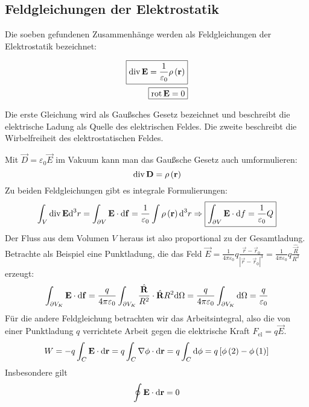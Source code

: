\subsection{Feldgleichungen der Elektrostatik\label{ref-020}}

Die soeben gefundenen Zusammenhänge werden als Feldgleichungen der Elektrostatik bezeichnet:

\begin{align}
	\label{3.4}
	\boxed{\operatorname{div} \mathbf{E}=\frac{1}{\varepsilon _{0}}\rho \left(\mathbf{r}\right)} \\
	\label{3.5}
	\boxed{\operatorname{rot} \mathbf{E}=0}
\end{align}

Die erste Gleichung wird als Gaußsches Gesetz bezeichnet und beschreibt die elektrische Ladung als Quelle des elektrischen Feldes. Die zweite beschreibt die Wirbelfreiheit des elektrostatischen Feldes.

Mit $\vec {D}=\varepsilon _{0}\vec {E}$ im Vakuum kann man das Gaußsche Gesetz auch umformulieren:
\begin{equation}
	\label{3.6}
	\operatorname{div} \mathbf{D}=\rho \left(\mathbf{r}\right)
\end{equation}
Zu beiden Feldgleichungen gibt es integrale Formulierungen:
\begin{equation*}
	\int _{V}\operatorname{div} \mathbf{E}\text{d} ^{3}r=\int _{\partial V}\mathbf{E}\cdot \text{d} \mathbf{f}=\frac{1}{\varepsilon _{0}}\int \rho \left(\mathbf{r}\right)\text{d} ^{3}r\Rightarrow \boxed{\int _{\partial V}\mathbf{E}\cdot \text{d} f=\frac{1}{\varepsilon _{0}}Q}
\end{equation*}
Der Fluss aus dem Volumen $V$ heraus ist also proportional zu der Gesamtladung. Betrachte als Beispiel eine Punktladung, die das Feld $\vec {E}=\frac{1}{4\pi \varepsilon _{0}}q\frac{\vec {r}-\vec {r}_{0}}{\left| \vec {r}-\vec {r}_{0}\right| ^{3}}=\frac{1}{4\pi \varepsilon _{0}}q\frac{\hat{\vec {R}}}{R^{2}}$ erzeugt:
\begin{equation*}
	\int _{\partial V_{K}}\mathbf{E}\cdot \text{d} \mathbf{f}=\frac{q}{4\pi \varepsilon _{0}}\int _{\partial V_{K}}\frac{\hat{\mathbf{R}}}{R^{2}}\cdot \hat{\mathbf{R}}R^{2}\text{d} \Omega  =\frac{q}{4\pi \varepsilon _{0}}\int _{\partial V_{K}}\text{d} \Omega  =\frac{q}{\varepsilon _{0}}
\end{equation*}
Für die andere Feldgleichung betrachten wir das Arbeitsintegral, also die von einer Punktladung $q$ verrichtete Arbeit gegen die elektrische Kraft $F_{\mathrm{el}}=q\vec {E}$.
\begin{equation*}
	W=-q\int _{C}\mathbf{E}\cdot \text{d} \mathbf{r}=q\int _{C}\nabla \phi \cdot \text{d} \mathbf{r}=q\int _{C}\text{d} \phi =q\left[\phi \left(2\right)-\phi \left(1\right)\right]
\end{equation*}
Insbesondere gilt
\begin{equation}
	\label{3.7}
	\oint \mathbf{E}\cdot \text{d} \mathbf{r}=0
\end{equation}

